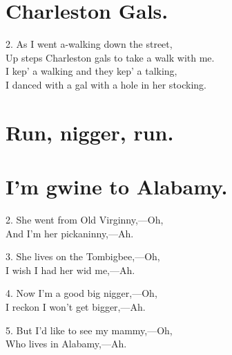 \documentclass[a5paper,10pt]{book}
\begin{document}
\newpage
\section{Charleston Gals.}
\thispagestyle{empty}

\begin{song}
\end{song}

\begin{stanza}
\item[2.]
  As I went a-walking down the street,\\
  Up steps Charleston gals to take a walk with me.\\
  I kep' a walking and they kep' a talking,\\
  I danced with a gal with a hole in her stocking.
\end{stanza}


\newpage
\section{Run, nigger, run.}
\thispagestyle{empty}

\begin{song}
\end{song}


\newpage
\section{I'm gwine to Alabamy.}
\thispagestyle{empty}

\begin{song}
\end{song}

\begin{stanza}
\item[2.]
  She went from Old Virginny,---Oh, \\
  And I'm her pickaninny,---Ah.

\item[3.]
  She lives on the Tombigbee,---Oh, \\
  I wish I had her wid me,---Ah.

\item[4.]
  Now I'm a good big nigger,---Oh, \\
  I reckon I won't get bigger,---Ah.

\item[5.]
  But I'd like to see my mammy,---Oh, \\
  Who lives in Alabamy,---Ah.
\end{stanza}
\end{document}
